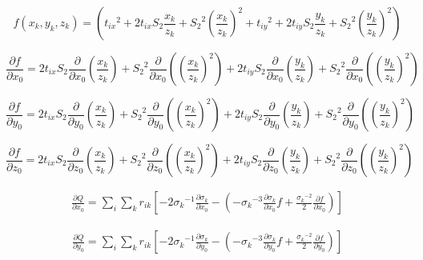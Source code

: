 \documentclass{article}
\begin{document}
\begin{equation}
f(x_k,y_k,z_k) = \left({t_{ix}}^2 + 2t_{ix}S_2\frac{x_k}{z_k} + {S_2}^2\left(\frac{x_k}{z_k}\right)^2 + {t_{iy}}^2 + 2t_{iy}S_2\frac{y_k}{z_k} + {S_2}^2\left(\frac{y_k}{z_k}\right)^2 \right)
\end{equation}

\begin{equation}
\frac{\partial f}{\partial x_0} = 2t_{ix}S_2 \frac{\partial}{\partial x_0} \left(\frac{x_k}{z_k}\right) + {S_2}^2 \frac{\partial}{\partial x_0}\left(\left(\frac{x_k}{z_k}\right)^2\right) + 2t_{iy}S_2 \frac{\partial}{\partial x_0} \left(\frac{y_k}{z_k}\right) + {S_2}^2 \frac{\partial}{\partial x_0}\left(\left(\frac{y_k}{z_k}\right)^2\right)
\end{equation}

\begin{equation}
\frac{\partial f}{\partial y_0} = 2t_{ix}S_2 \frac{\partial}{\partial y_0} \left(\frac{x_k}{z_k}\right) + {S_2}^2 \frac{\partial}{\partial y_0}\left(\left(\frac{x_k}{z_k}\right)^2\right) + 2t_{iy}S_2 \frac{\partial}{\partial y_0} \left(\frac{y_k}{z_k}\right) + {S_2}^2 \frac{\partial}{\partial y_0}\left(\left(\frac{y_k}{z_k}\right)^2\right)
\end{equation}

\begin{equation}
\frac{\partial f}{\partial z_0} = 2t_{ix}S_2 \frac{\partial}{\partial z_0} \left(\frac{x_k}{z_k}\right) + {S_2}^2 \frac{\partial}{\partial z_0}\left(\left(\frac{x_k}{z_k}\right)^2\right) + 2t_{iy}S_2 \frac{\partial}{\partial z_0} \left(\frac{y_k}{z_k}\right) + {S_2}^2 \frac{\partial}{\partial z_0}\left(\left(\frac{y_k}{z_k}\right)^2\right)
\end{equation}

\begin{align} \label{eqn:dx_no_weight}
\frac{\partial Q}{\partial x_0} = \sum_i \sum_k r_{ik} \left[ -2{\sigma_k}^{-1}\frac{\partial \sigma_k}{\partial x_0} - \left( -{\sigma_k}^{-3} \frac{\partial \sigma_k}{\partial x_0}f + \frac{{\sigma_k}^{-2}}{2} \frac{\partial f}{\partial x_0}  \right) \right] 
\end{align}

\begin{align} \label{eqn:dy_no_weight}
\frac{\partial Q}{\partial y_0} = \sum_i \sum_k r_{ik} \left[ -2{\sigma_k}^{-1}\frac{\partial \sigma_k}{\partial y_0} - \left( -{\sigma_k}^{-3} \frac{\partial \sigma_k}{\partial y_0}f + \frac{{\sigma_k}^{-2}}{2} \frac{\partial f}{\partial y_0}  \right) \right] 
\end{align}
\end{document}

